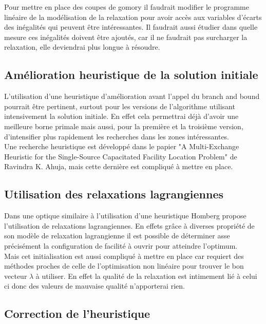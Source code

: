 \documentclass[12pt,a4paper]{article}
\begin{document}
Pour mettre en place des coupes de gomory il faudrait modifier le programme linéaire de la modélisation de la relaxation pour avoir accès aux variables d'écarts des inégalités qui peuvent être intéressantes. Il faudrait aussi étudier dans quelle mesure ces inégalités doivent être ajoutés, car il ne faudrait pas surcharger la relaxation, elle deviendrai plus longue à résoudre.

\subsection{Amélioration heuristique de la solution initiale}

L'utilisation d'une heuristique d'amélioration avant l'appel du branch and bound pourrait être pertinent, surtout pour les versions de l'algorithme utilisant intensivement la solution initiale. En effet cela permettrai déjà d'avoir une meilleure borne primale mais aussi, pour la première et la troisième version, d'intensifier plus rapidement les recherches dans les zones intéressantes.\\

Une recherche heuristique est développé dans le papier "A Multi-Exchange Heuristic for the Single-Source Capacitated Facility Location Problem" de Ravindra K. Ahuja, mais cette dernière est compliqué à mettre en place.

\subsection{Utilisation des relaxations lagrangiennes}

Dans une optique similaire à l'utilisation d'une heuristique Homberg propose l'utilisation de relaxations lagrangiennes. En effets grâce à diverses propriété de son modèle de relaxation lagrangienne il est possible de déterminer asse précisément la configuration de facilité à ouvrir pour atteindre l'optimum.\\

Mais cet initialisation est aussi compliqué à mettre en place car requiert des méthodes proches de celle de l'optimisation non linéaire pour trouver le bon vecteur $\lambda$ à utiliser. En effet la qualité de la relaxation est intimement lié à celui ci donc des valeurs de mauvaise qualité n’apporterai rien.\\

\subsection{Correction de l'heuristique}
\end{document}
